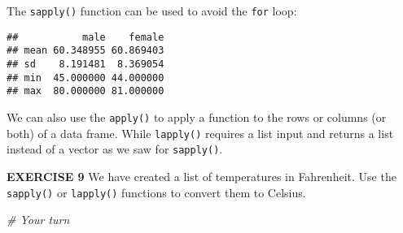 \documentclass[
]{article}
\newenvironment{Shaded}{\begin{snugshade}}{\end{snugshade}}
\newcommand{\CommentTok}[1]{\textcolor[rgb]{0.56,0.35,0.01}{\textit{#1}}}
\newcommand{\DecValTok}[1]{\textcolor[rgb]{0.00,0.00,0.81}{#1}}
\newcommand{\KeywordTok}[1]{\textcolor[rgb]{0.13,0.29,0.53}{\textbf{#1}}}
\newcommand{\NormalTok}[1]{#1}
\newcommand{\OperatorTok}[1]{\textcolor[rgb]{0.81,0.36,0.00}{\textbf{#1}}}
\newcommand{\StringTok}[1]{\textcolor[rgb]{0.31,0.60,0.02}{#1}}
\begin{document}
The \texttt{sapply()} function can be used to avoid the \texttt{for}
loop:

\begin{Shaded}
\end{Shaded}

\begin{verbatim}
##           male    female
## mean 60.348955 60.869403
## sd    8.191481  8.369054
## min  45.000000 44.000000
## max  80.000000 81.000000
\end{verbatim}

We can also use the \texttt{apply()} to apply a function to the rows or
columns (or both) of a data frame. While \texttt{lapply()} requires a
list input and returns a list instead of a vector as we saw for
\texttt{sapply()}.

\textbf{EXERCISE 9} We have created a list of temperatures in
Fahrenheit. Use the \texttt{sapply()} or \texttt{lapply()} functions to
convert them to Celsius.

\begin{Shaded}
\begin{Highlighting}[]
\CommentTok{# Your turn}
\end{Highlighting}
\end{Shaded}
\end{document}
